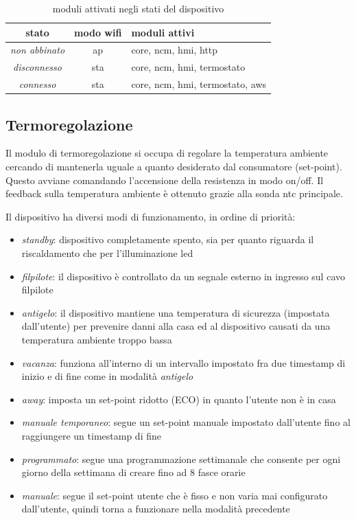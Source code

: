 \documentclass[12pt,a4paper,twoside,titlepage]{book}
\begin{document}
\begin{table}
    \centering
    \begin{tabular}{| c | c | l |}
        \hline
        stato & modo \Gls{wifi} & moduli attivi \\ \hline
        \textit{non abbinato} & \acrshort{ap} & core, \acrshort{ncm}, \acrshort{hmi}, \acrshort{http} \\ \hline
        \textit{disconnesso} & \acrshort{sta} & core, \acrshort{ncm}, \acrshort{hmi}, termostato \\ \hline
        \textit{connesso} & \acrshort{sta} & core, \acrshort{ncm}, \acrshort{hmi}, termostato, \acrshort{aws} \\ \hline
    \end{tabular}
    \caption{moduli attivati negli stati del dispositivo}
    \label{table:state_mode}
\end{table}

\subsection{Termoregolazione}

Il modulo di termoregolazione si occupa di regolare la temperatura ambiente cercando di mantenerla
uguale a quanto desiderato dal consumatore (set-point). Questo avviane comandando l'accensione della 
resistenza in modo on/off. Il feedback sulla temperatura ambiente è ottenuto grazie alla sonda \acrshort{ntc} principale.

Il dispositivo ha diversi modi di funzionamento, in ordine di priorità:
\begin{itemize}
    \item \textit{standby}: dispositivo completamente spento, sia per quanto riguarda il riscaldamento
    che per l'illuminazione \acrshort{led}
    \item \textit{\gls{filpilote}}: il dispositivo è controllato da un segnale
        esterno in ingresso sul cavo \Gls{filpilote}
    \item \textit{antigelo}: il dispositivo mantiene una temperatura di sicurezza (impostata dall'utente)
        per prevenire danni alla casa ed al dispositivo causati da una temperatura ambiente troppo bassa
    \item \textit{vacanza}: funziona all'interno di un intervallo impostato fra due timestamp di inizio e di 
        fine come in modalità \textit{antigelo}
    \item \textit{away}: imposta un set-point ridotto (ECO) in quanto l'utente non è in casa
    \item \textit{manuale temporaneo}: segue un set-point manuale impostato dall'utente fino al raggiungere 
        un timestamp di fine
    \item \textit{programmato}: segue una programmazione settimanale che consente per ogni
        giorno della settimana di creare fino ad 8 fasce orarie
    \item \textit{manuale}: segue il set-point utente che è fisso e non varia mai
        configurato dall'utente, quindi torna a funzionare nella modalità precedente
\end{itemize}
\end{document}
